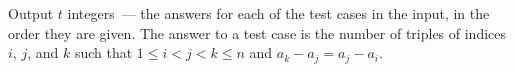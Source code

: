 Output $t$ integers~--- the answers for each of the test cases in the input, in the order they are given. The answer to a test case is the number of triples of indices $i$, $j$, and $k$ such that $1 \le i < j < k \le n$ and $a_k-a_j=a_j-a_i$.